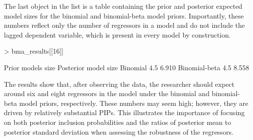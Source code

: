 \documentclass[a4paper]{article}
\begin{document}
The last object in the list is a table containing the prior and posterior expected model sizes for the binomial and binomial-beta model priors.
Importantly, these numbers reflect only the number of regressors in a model and do not include the lagged dependent variable, which is present in every model by construction.
\begin{Schunk}
\begin{Sinput}
> bma_results[[16]]
\end{Sinput}
\begin{Soutput}
              Prior models size Posterior model size
Binomial                    4.5                6.910
Binomial-beta               4.5                8.558
\end{Soutput}
\end{Schunk}

The results show that, after observing the data, the researcher should expect around six and eight regressors in the model under the binomial and binomial-beta model priors, respectively.
These numbers may seem high; however, they are driven by relatively substantial PIPs.
This illustrates the importance of focusing on both posterior inclusion probabilities and the ratios of posterior mean to posterior standard deviation when assessing the robustness of the regressors.
\end{document}
